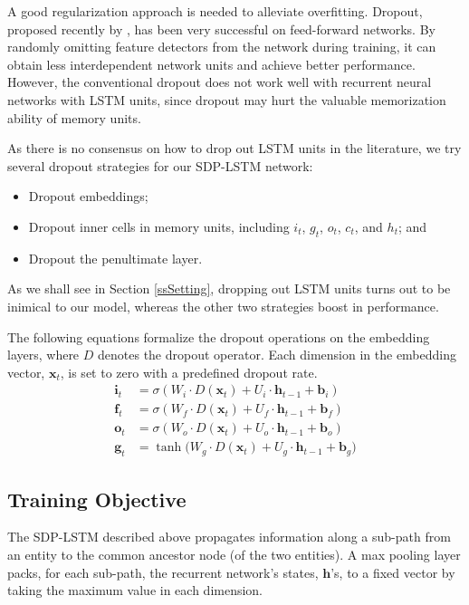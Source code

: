 \documentclass[11pt,a4paper]{article}
\begin{document}
A good regularization approach is needed to alleviate overfitting. Dropout, proposed recently by , 
has been very successful on feed-forward networks. By randomly omitting feature detectors from the network during training, it can obtain less interdependent network units and achieve better performance. However, the conventional dropout does not work well with recurrent neural networks with LSTM units, since dropout may hurt the valuable memorization ability of memory units.

As there is no consensus on how to drop out LSTM units in the literature,
we try several dropout strategies for our SDP-LSTM network:
\begin{itemize}
\item Dropout embeddings;
\item Dropout inner cells in memory units, including $i_t$, $g_t$, $o_t$, $c_t$, and $h_t$; and
\item Dropout the penultimate layer.
\end{itemize}
As we shall see in Section \ref{ssSetting},
dropping out LSTM units turns out to be inimical to our model, whereas
the other two strategies boost in performance.

The following equations formalize the dropout operations
on the embedding layers, where ${D}$ denotes the dropout operator.
Each dimension in the embedding vector, $\bm x_t$, is set to zero with a predefined dropout rate.
\begin{align}
\bm i_t &= \sigma(W_i\!\cdot\!D(\bm x_t)+U_i\!\cdot\!\bm h_{t-1}+\bm b_i)\label{edrop1}\\
\bm f_t &= \sigma(W_f\!\cdot\!D(\bm x_t)+U_f\!\cdot\!\bm h_{t-1}+\bm b_f)\label{edrop2}\\
\bm o_t &= \sigma(W_o\!\cdot\!D(\bm x_t)+U_o\!\cdot\!\bm h_{t-1}+\bm b_o)\\
\bm g_t &= \tanh\!\Big(W_g\!\cdot\!D(\bm x_t)+U_g\!\cdot\!\bm h_{t-1}+\bm b_g\Big)
\end{align}


\subsection{Training Objective}\label{ssObjective}

The SDP-LSTM described above
propagates information along a sub-path from an entity
to the common ancestor node (of the two entities).
A max pooling layer packs, for each sub-path, the recurrent network's states, $\bm h$'s,
to a fixed vector by taking the maximum value in each dimension.
\end{document}
